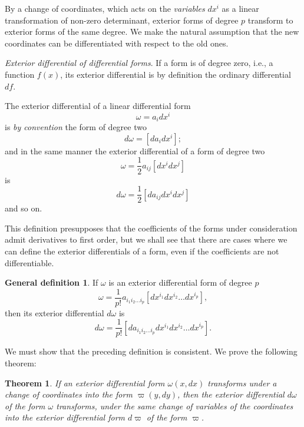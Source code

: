 \documentclass[leqno,11pt]{book}
\numberwithin{equation}{chapter}
\theoremstyle{shape1}
\newtheorem*{thm*}{\hspace{15pt}Theorem}
\theoremstyle{shape0}
\theoremstyle{shape2}
\theoremstyle{definition}
\begin{document}
By a change of coordinates, which acts on the \emph{variables} $dx^{i}$ as a linear transformation of non-zero determinant, exterior forms of degree $p$ transform to exterior forms of the same degree. We make the natural assumption that the new coordinates can be differentiated with respect to the old ones.

\vspace{12pt}\fsec \emph{Exterior differential of differential forms}. If a form is of degree zero, {i.e.}, a function $f(x)$, its exterior differential is by definition the ordinary differential $df$.

The exterior differential of a linear differential form
\[
\omega=a_{i}dx^{i}
\]
is \emph{by convention} the form of degree two
\[
d\omega=[da_{i}dx^{i}];
\]
and in the same manner the exterior differential of a form of degree two
\[
\omega=\frac{1}{2}a_{ij}[dx^{i}dx^{j}]
\]is
\[
d\omega=\frac{1}{2}[da_{ij}dx^{i}dx^{j}]
\]
and so on.

This definition presupposes that the coefficients of the forms under consideration admit derivatives to first order, but we shall see that there are cases where we can define the exterior differentials of a form, even if the coefficients are not differentiable.

\theoremstyle{shape1}
\newtheorem*{gdef*}{\hspace{15pt}General definition}

\begin{gdef*}
  If $\omega$ is an exterior differential form of degree $p$
  \begin{equation}
    \label{eq:2.1}
    \omega=\frac{1}{p!}a_{i_{1}i_{2}\dots i_{p}}[dx^{i_{1}}dx^{i_{2}}\dots dx^{i_{p}}],
  \end{equation}
then its exterior differential $d\omega$ is
\begin{equation}
  \label{eq:2.2}
    d\omega=\frac{1}{p!}[da_{i_{1}i_{2}\dots i_{p}}dx^{i_{1}}dx^{i_{2}}\dots dx^{i_{p}}].
\end{equation}
\end{gdef*}

\vspace{12pt}\fsec We must show that the preceding definition is consistent. We  prove the following theorem:

\begin{thm*}
  If an exterior differential form $\omega(x,dx)$ transforms under a change of coordinates into the form $\varpi(y,dy)$, then the exterior differential $d\omega$ of the form $\omega$ transforms, under the same change of variables of the coordinates into the exterior differential form $d\varpi$ of the form $\varpi$.
\end{thm*}
\end{document}
